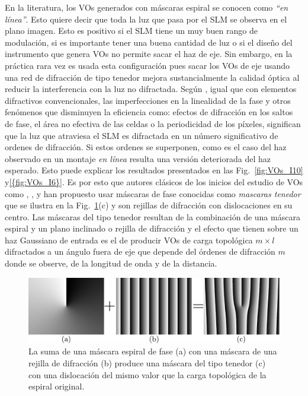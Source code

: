 En la literatura, los VOs generados con máscaras espiral se conocen
como \textit{``en línea''}. Esto quiere decir que toda la luz que pasa
por el SLM se observa en el plano imagen. Esto es positivo si el SLM
tiene un muy buen rango de modulación, si es importante tener una
buena cantidad de luz o si el diseño del instrumento que genera VOs no
permite sacar el haz de eje. Sin embargo, en la práctica rara vez es usada esta
configuración pues sacar los VOs de eje usando una red de difracción
de tipo tenedor mejora sustancialmente la calidad óptica al reducir la
interferencia con la luz no difractada.
Según , igual que con elementos difractivos
convencionales, las imperfecciones en la linealidad de la fase y otros
fenómenos que disminuyen la eficiencia como: efectos de difracción en los saltos de fase, el área no
efectiva de las celdas o la
periodicidad de los píxeles, significan
que la luz que atraviesa el SLM es difractada en un número
significativo de ordenes de difracción. Si estos ordenes se
superponen, como es el caso del haz observado en un montaje \textit{en línea} resulta
una versión deteriorada del haz esperado. Esto puede explicar los
resultados presentados en las Fig.~\ref{fig:VOs_I10}
y\ref{{fig:VOs_I6}}. Es por esto que autores clásicos de los
inicios del estudio de VOs como 
, , y
  han propuesto usar máscaras de fase conocidas
como \textit{mascaras tenedor} que se ilustra en la
Fig.~\ref{fig:fork_recipe}(c) y son rejillas de difracción con
dislocaciones en su centro. Las máscaras del tipo tenedor resultan de la combinación de una
máscara espiral y un plano inclinado o rejilla de difracción y el
efecto que tienen sobre un haz Gaussiano de entrada es el de producir VOs de
carga topológica $m\times l$ difractados a un ángulo fuera de eje que
depende del órdenes de
difracción $m$ donde se observe, de la longitud de onda y de la distancia.
\begin{figure}[h!]
\centering
\includegraphics[scale=.7]{fork_recipe.pdf}
\caption[Composición de una máscara tipo tenedor con dislocación de
carga 1]{La suma de una máscara espiral de fase (a) con una máscara de
una rejilla de difracción (b) produce una máscara del tipo tenedor
(c) con una dislocación del mismo valor que la carga topológica de la
espiral original.} 
\label{fig:fork_recipe}
\end{figure}

